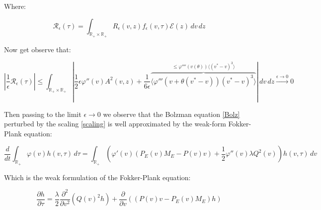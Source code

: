 \documentclass[12pt,a4paper]{article}
\numberwithin{theorem}{section}
\numberwithin{definition}{section}
\numberwithin{example}{section}
\numberwithin{exercise}{section}
\newcommand{\R}{\mathbb{R}}
\begin{document}
Where:

\[\mathcal{R}_{\epsilon}(\tau) = \int_{\R_+\times\R_+}R_{\epsilon}(v,z)f_{\epsilon}(v,\tau)\mathcal{E}(z) \,dv\,dz\]

Now get observe that:

\[\left|\frac{1}{\epsilon}\mathcal{R}_{\epsilon}(\tau)\right|\leq \int_{\R_+\times\R_+}|\frac{1}{2}\epsilon\varphi''(v)A^2(v,z)+\frac{1}{6\epsilon}\overbrace{\langle\varphi'''(v+\theta(v^{*}-v))(v^{*}-v)^3\rangle}^{\leq \varphi''''(v(\theta))\langle(v^{*}-v)^3\rangle}| \,dv\,dz\xrightarrow{\epsilon\to0}0\]

Then passing to the limit $\epsilon\to0$ we observe that the Bolzman equation \ref{Bolz} perturbed by the scaling \ref{scaling} is well approximated by the weak-form Fokker-Plank equation:

\begin{equation}\label{Intform}
    \frac{d}{dt}\int_{\R_+}\varphi(v)h(v,\tau) \,d\tau = \int_{\R_+}\left(\varphi'(v)(P_E(v)M_E-P(v)v)+\frac{1}{2}\varphi''(v)\lambda Q^2(v)\right) h(v,\tau) \,dv    
\end{equation}



Which is the weak formulation of the Fokker-Plank equation:

\begin{equation}
    \frac{\partial h}{\partial\tau}=\frac{\lambda}{2}\frac{\partial^2}{\partial v^2}(Q(v)^2h)+\frac{\partial}{\partial v}((P(v)v-P_E(v)M_E)h)
\end{equation}




\newpage

\end{document}
